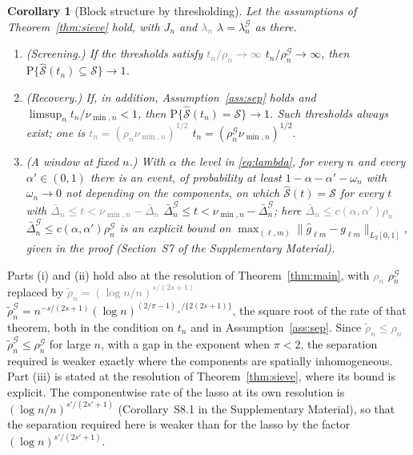 \documentclass[12pt]{article} %
\newtheorem{corollary}{Corollary}
\theoremstyle{definition}
\theoremstyle{plain}
\newcommand{\Prob}{\mathrm{P}}
\newcommand{\cv}{\ell}
\newcommand{\md}{m}
\newcommand{\gcomp}[2]{g_{#1#2}}
\newcommand{\pen}{\lambda}
\newcommand{\penn}{\lambda_{n}}
\newcommand{\seff}{s'}
\newcommand{\Gcal}{\mathcal{G}}
\newcommand{\lamG}{\lambda^{\mathcal{G}}_{n}}
\newcommand{\rhoG}{\rho^{\mathcal{G}}_{n}}
\newcommand{\rhoGt}{\tilde{\rho}^{\mathcal{G}}_{n}}
\begin{document}
{\begin{corollary}[Block structure by thresholding]
\label{cor:threshold}
Let the assumptions of Theorem~\ref{thm:sieve} hold, with $J_n$ and \textcolor{gray}{\sout{$\penn$}} $\pen = \lamG$ as
there.
\begin{enumerate}
\item[(i)] (Screening.) If the thresholds satisfy \textcolor{gray}{\sout{$t_n/\rho_n \to \infty$}} $t_n/\rhoG \to \infty$,
then $\Prob\{\widehat{\mathcal{S}}(t_n) \subseteq \mathcal{S}\} \to 1$.
\item[(ii)] (Recovery.) If, in addition, Assumption~\ref{ass:sep} holds and
$\limsup_n t_n/\nu_{\min,n} < 1$, then $\Prob\{\widehat{\mathcal{S}}(t_n) = \mathcal{S}\} \to 1$.
Such thresholds always exist; one is \textcolor{gray}{\sout{$t_n = (\rho_n\nu_{\min,n})^{1/2}$}} $t_n = (\rhoG\nu_{\min,n})^{1/2}$.
\item[(iii)] \textcolor{colR1}{(A window at fixed $n$.) With $\alpha$ the level in
\eqref{eq:lambda}, for every $n$ and every $\alpha' \in (0,1)$ there is an
event, of probability at least
$1 - \alpha - \alpha' - \omega_n$ with $\omega_n \to 0$ not depending on the
components, on which $\widehat{\mathcal{S}}(t) = \mathcal{S}$ for every $t$
with \textcolor{gray}{\sout{$\bar{\Delta}_n \le t < \nu_{\min,n} - \bar{\Delta}_n$}} $\bar{\Delta}^{\Gcal}_n \le t < \nu_{\min,n} - \bar{\Delta}^{\Gcal}_n$; here
\textcolor{gray}{\sout{$\bar{\Delta}_n \le c(\alpha,\alpha')\rho_n$}} $\bar{\Delta}^{\Gcal}_n \le c(\alpha,\alpha')\rhoG$ is an explicit bound on
$\max_{(\cv,\md)}\lVert \widehat{g}_{\cv\md} - \gcomp{\cv}{\md}
\rVert_{L_2[0,1]}$, given in the proof (Section~S7 of the Supplementary
Material).}
\end{enumerate}
\end{corollary}

\textcolor{colR1}{Parts (i) and (ii) hold also at the resolution of
Theorem~\ref{thm:main}, with \textcolor{gray}{\sout{$\rho_n$}} $\rhoG$ replaced by
\textcolor{gray}{\sout{$\tilde\rho_n = (\log n/n)^{s/(2s+1)}$}} $\rhoGt = n^{-s/(2s+1)}(\log n)^{(2/\pi-1)_{+}/\{2(2s+1)\}}$, the square root of the rate of that
theorem, both in the condition on $t_n$ and in Assumption~\ref{ass:sep}.
Since \textcolor{gray}{\sout{$\tilde\rho_n \le \rho_n$}} $\rhoGt \le \rhoG$ for large $n$, with a gap in the exponent when $\pi < 2$,
the separation required is weaker exactly where the components are spatially
inhomogeneous. Part (iii) is stated at the resolution of
Theorem~\ref{thm:sieve}, where its bound is explicit. The componentwise rate of
the lasso at its own resolution is $(\log n/n)^{\seff/(2\seff+1)}$
(Corollary~S8.1 in the Supplementary Material), so that the separation
required here is weaker than for the lasso by the factor
$(\log n)^{\seff/(2\seff+1)}$.}

}
\end{document}
